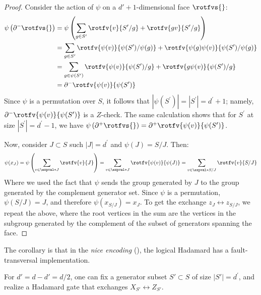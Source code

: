 \begin{proof}
Consider the action of $\psi$ on a $d'+1$-dimensional face $\rotfvs{}$:
  \begin{equation*}
    \begin{split}
      \psi \left( \partial^{-} \rotfvs{} \right) &= \psi \left( \sum_{g\in S^{\prime}} \rotfv{v}{S^{\prime}/g} + \rotfv{gv}{S^{\prime}/g}   \right) \\
      &= \sum_{g\in S^{\prime}} \rotfv{ \psi(v)}{\psi(S^{\prime})/\psi(g)} + \rotfv{\psi(g)\psi(v)}{\psi(S^{\prime})/\psi(g)}  \\
      &= \sum_{g\in \psi(S^{\prime}) } \rotfv{ \psi(v)}{\psi(S^{\prime})/g} + \rotfv{g\psi(v)}{\psi(S^{\prime})/g}  \\
      &= \partial^{-}\rotfv{\psi(v)}{\psi(S^{\prime})}
    \end{split}
  \end{equation*}
Since $\psi$ is a permutation over $S$, it follows that $|\psi(S^{\prime})| = |S^{\prime}| = d^{\prime} + 1$; namely, $\partial^{-}\rotfv{\psi(v)}{\psi(S^{\prime})}$ is a $Z$-check. The same calculation shows that for $S^{\prime}$ at size $|S^{\prime}|=d^{\prime}-1$, we have $\psi \left( \partial^{+} \rotfvs{} \right) = \partial^{+}\rotfv{\psi(v)}{\psi(S^{\prime})}$. 

Now, consider $J\subset S$ such $|J|=d^{\prime}$ and $\psi(J) = S/J$. Then: 
\begin{equation*}
  \begin{split}
    \psi(x_{J}) =  \psi \left( \sum_{v \in \expval*{J}} \rotfv{v}{J} \right) = \sum_{v \in \expval*{J}} \rotfv{\psi(v)}{\psi(J)} = \sum_{v \in \expval*{S/J}} \rotfv{v}{S/J} 
  \end{split}
\end{equation*}
Where we used the fact that $\psi$ sends the group generated by $J$ to the group generated by the complement generator set. Since $\psi$ is a permutation, $\psi(S/J) = J$, and therefore $\psi(x_{S/J}) = x_J$. To get the exchange $z_{J} \leftrightarrow z_{S/J}$, we repeat the above, where the root vertices in the sum are the vertices in the subgroup generated by the complement of the subset of generators spanning the face.
\end{proof}
The corollary is that in the \textit{nice encoding} (), the logical Hadamard has a fault-transversal implementation.
\begin{corollary}
  \label{corollary:hadamard}
  For $ d' = d - d' = d/2 $, one can fix a generator subset $ S' \subset S $ of size $|S'| = d^{\prime}$, and realize a Hadamard gate that exchanges $ X_{S'} \leftrightarrow Z_{S'} $.
\end{corollary}
